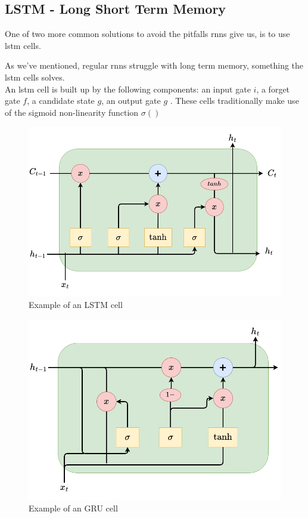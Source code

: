 \subsection{LSTM - Long Short Term Memory}

One of two more common solutions to avoid the pitfalls \acrshort{rnn}s give us, is to use \acrshort{lstm} cells. 

 As we've mentioned, regular \acrshort{rnn}s struggle with long term memory, something the \acrshort{lstm} cells solves. \\ 


An \acrshort{lstm} cell is built up by the following components: an input gate $i$, a forget gate $f$, a candidate state $g$, an output gate $g$ .
These cells traditionally make use of the sigmoid non-linearity function $\sigma()$

\begin{figure}[h]
    \centering
    \includegraphics[scale=.4]{figures/lstmcell.png}
    \caption{Example of an LSTM cell}
    \label{fig:lstmcell}
\end{figure}

\begin{figure}[h]
    \centering
    \includegraphics[scale=.4]{figures/grucell.png}
    \caption{Example of an GRU cell}
    \label{fig:lstmcell}
\end{figure}

